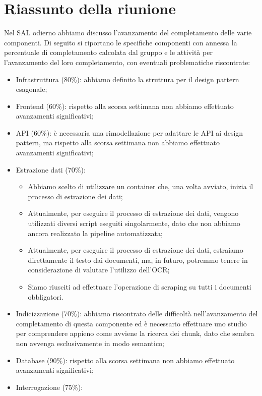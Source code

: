 \section{Riassunto della riunione}
Nel SAL odierno abbiamo discusso l'avanzamento del completamento delle varie componenti. Di seguito si riportano le specifiche componenti con annessa la percentuale di completamento calcolata dal gruppo e le attività per l'avanzamento del loro completamento, con eventuali problematiche riscontrate:
\begin{itemize} 
    \item Infrastruttura (80\%): abbiamo definito la struttura per il design pattern esagonale;
    \item Frontend (60\%): rispetto alla scorsa settimana non abbiamo effettuato avanzamenti significativi;
    \item API (60\%): è necessaria una rimodellazione per adattare le API ai design pattern, ma rispetto alla scorsa settimana non abbiamo effettuato avanzamenti significativi;
    \item Estrazione dati (70\%):
    \begin{itemize}
        \item Abbiamo scelto di utilizzare un container che, una volta avviato, inizia il processo di estrazione dei dati;
        \item Attualmente, per eseguire il processo di estrazione dei dati, vengono utilizzati diversi script eseguiti singolarmente, dato che non abbiamo ancora realizzato la pipeline automatizzata;
        \item Attualmente, per eseguire il processo di estrazione dei dati, estraiamo direttamente il testo dai documenti, ma, in futuro, potremmo tenere in considerazione di valutare l'utilizzo dell'OCR;
        \item Siamo riusciti ad effettuare l'operazione di scraping su tutti i documenti obbligatori.
    \end{itemize}
    \item Indicizzazione (70\%): abbiamo riscontrato delle difficoltà nell'avanzamento del completamento di questa componente ed è necessario effettuare uno studio per comprendere appieno come avviene la ricerca dei chunk, dato che sembra non avvenga esclusivamente in modo semantico;
    \item Database (90\%): rispetto alla scorsa settimana non abbiamo effettuato avanzamenti significativi;
    \item Interrogazione (75\%):
    \begin{itemize}

\end{itemize}
\end{itemize}
